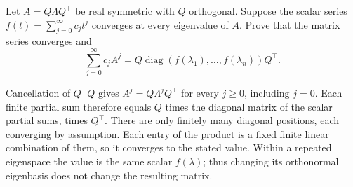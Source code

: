 \begin{problem}\label{ex:09:spectral-functions}
Let \(A=Q\Lambda Q^\top\) be real symmetric with \(Q\) orthogonal.
Suppose the scalar series \(f(t)=\sum_{j=0}^\infty c_jt^j\) converges at
every eigenvalue of \(A\). Prove that the matrix series converges and
\[
 \sum_{j=0}^\infty c_jA^j
 =Q\operatorname{diag}(f(\lambda_1),\ldots,f(\lambda_n))Q^\top.
\]
\end{problem}
\begin{solution}
Cancellation of \(Q^\top Q\) gives \(A^j=Q\Lambda^jQ^\top\) for every
\(j\geqslant0\), including \(j=0\).
Each finite partial sum therefore equals \(Q\) times the diagonal matrix
of the scalar partial sums, times \(Q^\top\).
There are only finitely many diagonal positions, each converging by
assumption. Each entry of the product is a fixed finite linear
combination of them, so it converges to the stated value.
Within a repeated eigenspace the value is the same scalar
\(f(\lambda)\); thus changing its orthonormal eigenbasis does not
change the resulting matrix.
\end{solution}
